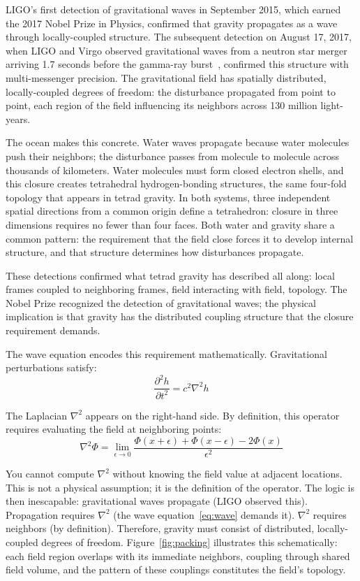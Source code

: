 \documentclass[aps,prd,preprint,superscriptaddress,showpacs,preprintnumbers,amsmath,amssymb,nofootinbib]{revtex4-2}
\begin{document}
LIGO's first detection of gravitational waves in September 2015, which earned the 2017 Nobel Prize in Physics, confirmed that gravity propagates as a wave through locally-coupled structure. The subsequent detection on August 17, 2017, when LIGO and Virgo observed gravitational waves from a neutron star merger arriving 1.7 seconds before the gamma-ray burst~\cite{gw170817}, confirmed this structure with multi-messenger precision. The gravitational field has spatially distributed, locally-coupled degrees of freedom: the disturbance propagated from point to point, each region of the field influencing its neighbors across 130 million light-years.

The ocean makes this concrete. Water waves propagate because water molecules push their neighbors; the disturbance passes from molecule to molecule across thousands of kilometers. Water molecules must form closed electron shells, and this closure creates tetrahedral hydrogen-bonding structures, the same four-fold topology that appears in tetrad gravity. In both systems, three independent spatial directions from a common origin define a tetrahedron: closure in three dimensions requires no fewer than four faces. Both water and gravity share a common pattern: the requirement that the field close forces it to develop internal structure, and that structure determines how disturbances propagate.

These detections confirmed what tetrad gravity has described all along: local frames coupled to neighboring frames, field interacting with field, topology. The Nobel Prize recognized the detection of gravitational waves; the physical implication is that gravity has the distributed coupling structure that the closure requirement demands.

The wave equation encodes this requirement mathematically. Gravitational perturbations satisfy:
\begin{equation}
\frac{\partial^2 h}{\partial t^2} = c^2 \nabla^2 h
\label{eq:wave}
\end{equation}

The Laplacian $\nabla^2$ appears on the right-hand side. By definition, this operator requires evaluating the field at neighboring points:
\begin{equation}
\nabla^2 \Phi = \lim_{\epsilon \to 0} \frac{\Phi(x+\epsilon) + \Phi(x-\epsilon) - 2\Phi(x)}{\epsilon^2}
\label{eq:laplacian}
\end{equation}

You cannot compute $\nabla^2$ without knowing the field value at adjacent locations. This is not a physical assumption; it is the definition of the operator. The logic is then inescapable: gravitational waves propagate (LIGO observed this). Propagation requires $\nabla^2$ (the wave equation~\eqref{eq:wave} demands it). $\nabla^2$ requires neighbors (by definition). Therefore, gravity must consist of distributed, locally-coupled degrees of freedom. Figure~\ref{fig:packing} illustrates this schematically: each field region overlaps with its immediate neighbors, coupling through shared field volume, and the pattern of these couplings constitutes the field's topology.
\end{document}
